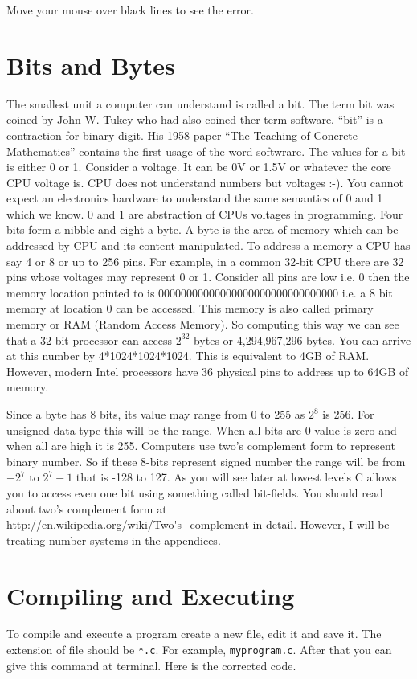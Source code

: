 Move your mouse over black lines to see the error.

\section{Bits and Bytes}
The smallest unit a computer can understand is called a bit. The term bit 
was coined by John W. Tukey who had also coined ther term software. ``bit'' 
is a contraction for binary digit. His 1958 paper ``The Teaching of Concrete 
Mathematics'' contains the first usage of the word softwrare. The values for a
bit is either 0 or 1. Consider a voltage. It can be 0V or 1.5V or whatever the
core CPU voltage is. CPU does not understand numbers but voltages :-). You
cannot expect an electronics hardware to understand the same semantics of 0 and
1 which we know. 0 and 1 are abstraction of CPUs voltages in programming. Four
bits form a nibble and eight a byte. A byte is the area of memory which
can be addressed by CPU and its content manipulated. To address a memory a CPU
has say 4 or 8 or up to 256 pins. For example, in a common 32-bit CPU there are
32 pins whose voltages may represent 0 or 1. Consider all pins are low i.e. 0
then the memory location pointed to is 00000000000000000000000000000000 i.e. a
8 bit memory at location 0 can be accessed. This memory is also called primary
memory or RAM (Random Access Memory). So computing this way we can see that a
32-bit processor can access $2^{32}$ bytes or 4,294,967,296 bytes. You can
arrive at this number by 4*1024*1024*1024. This is equivalent to 4GB of
RAM. However, modern Intel processors have 36 physical pins to address up to
64GB of memory.

Since a byte has 8 bits, its value may range from 0 to 255 as $2^8$ is 256. For
unsigned data type this will be the range. When all bits are 0 value is zero
and when all are high it is 255. Computers use two's complement form to
represent binary number. So if these 8-bits represent signed number the range
will be from $-2^7$ to $2^7-1$ that is -128 to 127. As you will see later at
lowest levels C allows you to access even one bit using something called
bit-fields. You should read about two's complement form at
\url{http://en.wikipedia.org/wiki/Two's\_complement} in detail. However, I will
be treating number systems in the appendices.

\section{Compiling and Executing}
To compile and execute a program create a new file, edit it and save it. The
extension of file should be \texttt{*.c}. For example,
\texttt{myprogram.c}. After that you can give this command at terminal. Here is
the corrected code.

